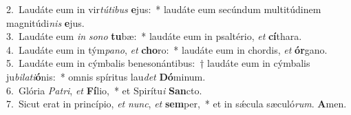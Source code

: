{2.~}Laudáte eum in vir\textit{tú}\textit{ti}\textit{bus} \textbf{e}jus:~* laudáte eum secúndum multitúdinem magnitúdi\textit{nis} \textbf{e}jus.\\
{3.~}Laudáte eum \textit{in} \textit{so}\textit{no} \textbf{tu}bæ:~* laudáte eum in psaltério, \textit{et} \textbf{cí}thara.\\
{4.~}Laudáte eum in tým\textit{pa}\textit{no}, \textit{et} \textbf{cho}ro:~* laudáte eum in chordis, \textit{et} \textbf{ór}gano.\\
{5.~}Laudáte eum in cýmbalis benesonántibus:~† laudáte eum in cýmbalis ju\textit{bi}\textit{la}\textit{ti}\textbf{ó}nis:~* omnis spíritus lau\textit{det} \textbf{Dó}minum.\\
{6.~}Glória \textit{Pa}\textit{tri}, \textit{et} \textbf{Fí}lio,~* et Spirítu\textit{i} \textbf{San}cto.\\
{7.~}Sicut erat in princípio, \textit{et} \textit{nunc}, \textit{et} \textbf{sem}per,~* et in sǽcula sæculó\textit{rum}. \textbf{A}men.\\
